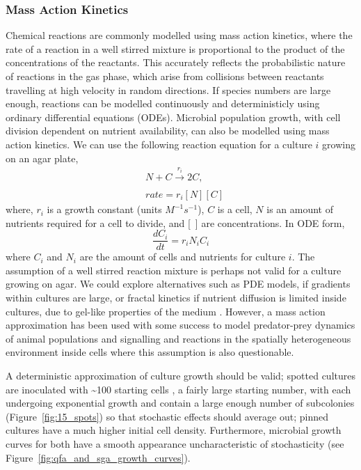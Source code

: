 \begin{multicols}{2}
\subsubsection{Mass Action Kinetics}
Chemical reactions are commonly modelled using mass action kinetics, where the rate of a
reaction in a well stirred mixture is proportional to the product of the concentrations of
the reactants. This accurately reflects the probabilistic nature of reactions in the gas
phase, which arise from collisions between reactants travelling at high velocity in random
directions. If species numbers are large enough, reactions can be modelled continuously
and deterministicly using ordinary differential equations (ODEs). Microbial population
growth, with cell division dependent on nutrient availability, can also be modelled using
mass action kinetics. We can use the following reaction equation for a culture \(i\)
growing on an agar plate,
\begin{subequations}
  \label{eq:9}
  \begin{align}
    &N + C \xrightarrow[]{r_{i}} 2C,\\
    &rate = r_{i}[N][C]
  \end{align}
\end{subequations}
where, \(r_{i}\) is a growth constant (units \(M^{-1}s^{-1}\)), \(C\) is a cell, \(N\) is an amount of nutrients
required for a cell to divide, and [~] are concentrations. In ODE form,
\begin{equation}
  \label{eq:10}
  \frac{dC_{i}}{dt} = r_{i}N_{i}C_{i}
\end{equation}
where \(C_{i}\) and \(N_{i}\) are the amount of cells and nutrients for culture \(i\).
The assumption of a well stirred reaction mixture is perhaps not valid for a culture
growing on agar. We could explore alternatives such as PDE models, if gradients within
cultures are large, or fractal kinetics if nutrient diffusion is limited inside cultures,
due to gel-like properties of the medium \citep{savageau1995,Kopelman1988}. However, a
mass action approximation has been used with some success to model predator-prey dynamics
of animal populations \citep{Berryman1992} and signalling and reactions in the spatially
heterogeneous environment inside cells \citep{Aldridge2006,Chen2010} where this assumption
is also questionable.

A deterministic approximation of culture growth should be valid; spotted cultures are
inoculated with \textasciitilde 100 starting cells \citep{Addinall2011}, a fairly large
starting number, with each undergoing exponential growth and contain a large enough number
of subcolonies (Figure~\ref{fig:15_spots}) so that stochastic effects should average out;
pinned cultures have a much higher initial cell density. Furthermore, microbial growth
curves for both have a smooth appearance uncharacteristic of stochasticity (see
Figure~\ref{fig:qfa_and_sga_growth_curves}).


\end{multicols}
